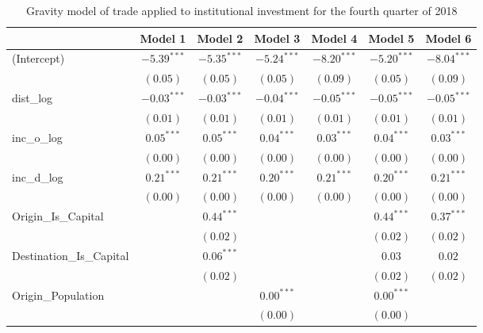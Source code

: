 \begin{table}
	\begin{center}
		\small
		\caption[Gravity Model of Trade for Q4 2018]{Gravity model of trade applied to institutional investment for the fourth quarter of 2018}
		\begin{tabular}{l c c c c c c }
		\hline
		& Model 1 & Model 2 & Model 3 & Model 4 & Model 5 & Model 6 \\
		\hline
		(Intercept)                  & $-5.39^{***}$ & $-5.35^{***}$ & $-5.24^{***}$ & $-8.20^{***}$ & $-5.20^{***}$ & $-8.04^{***}$ \\
		& $(0.05)$      & $(0.05)$      & $(0.05)$      & $(0.09)$      & $(0.05)$      & $(0.09)$      \\
		dist\_log                    & $-0.03^{***}$ & $-0.03^{***}$ & $-0.04^{***}$ & $-0.05^{***}$ & $-0.05^{***}$ & $-0.05^{***}$ \\
		& $(0.01)$      & $(0.01)$      & $(0.01)$      & $(0.01)$      & $(0.01)$      & $(0.01)$      \\
		inc\_o\_log                  & $0.05^{***}$  & $0.05^{***}$  & $0.04^{***}$  & $0.03^{***}$  & $0.04^{***}$  & $0.03^{***}$  \\
		& $(0.00)$      & $(0.00)$      & $(0.00)$      & $(0.00)$      & $(0.00)$      & $(0.00)$      \\
		inc\_d\_log                  & $0.21^{***}$  & $0.21^{***}$  & $0.20^{***}$  & $0.21^{***}$  & $0.20^{***}$  & $0.21^{***}$  \\
		& $(0.00)$      & $(0.00)$      & $(0.00)$      & $(0.00)$      & $(0.00)$      & $(0.00)$      \\
		Origin\_Is\_Capital          &               & $0.44^{***}$  &               &               & $0.44^{***}$  & $0.37^{***}$  \\
		&               & $(0.02)$      &               &               & $(0.02)$      & $(0.02)$      \\
		Destination\_Is\_Capital     &               & $0.06^{***}$  &               &               & $0.03$        & $0.02$        \\
		&               & $(0.02)$      &               &               & $(0.02)$      & $(0.02)$      \\
		Origin\_Population           &               &               & $0.00^{***}$  &               & $0.00^{***}$  &               \\
		&               &               & $(0.00)$      &               & $(0.00)$      &               \\

\end{tabular}
\end{center}
\end{table}
